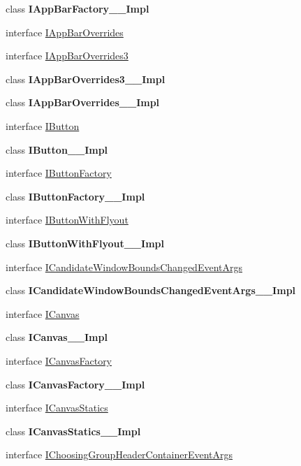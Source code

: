 \begin{DoxyCompactItemize}
class {\bfseries I\+App\+Bar\+Factory\+\_\+\+\_\+\+Impl}
\item 
interface \hyperlink{interface_windows_1_1_u_i_1_1_xaml_1_1_controls_1_1_i_app_bar_overrides}{I\+App\+Bar\+Overrides}
\item 
interface \hyperlink{interface_windows_1_1_u_i_1_1_xaml_1_1_controls_1_1_i_app_bar_overrides3}{I\+App\+Bar\+Overrides3}
\item 
class {\bfseries I\+App\+Bar\+Overrides3\+\_\+\+\_\+\+Impl}
\item 
class {\bfseries I\+App\+Bar\+Overrides\+\_\+\+\_\+\+Impl}
\item 
interface \hyperlink{interface_windows_1_1_u_i_1_1_xaml_1_1_controls_1_1_i_button}{I\+Button}
\item 
class {\bfseries I\+Button\+\_\+\+\_\+\+Impl}
\item 
interface \hyperlink{interface_windows_1_1_u_i_1_1_xaml_1_1_controls_1_1_i_button_factory}{I\+Button\+Factory}
\item 
class {\bfseries I\+Button\+Factory\+\_\+\+\_\+\+Impl}
\item 
interface \hyperlink{interface_windows_1_1_u_i_1_1_xaml_1_1_controls_1_1_i_button_with_flyout}{I\+Button\+With\+Flyout}
\item 
class {\bfseries I\+Button\+With\+Flyout\+\_\+\+\_\+\+Impl}
\item 
interface \hyperlink{interface_windows_1_1_u_i_1_1_xaml_1_1_controls_1_1_i_candidate_window_bounds_changed_event_args}{I\+Candidate\+Window\+Bounds\+Changed\+Event\+Args}
\item 
class {\bfseries I\+Candidate\+Window\+Bounds\+Changed\+Event\+Args\+\_\+\+\_\+\+Impl}
\item 
interface \hyperlink{interface_windows_1_1_u_i_1_1_xaml_1_1_controls_1_1_i_canvas}{I\+Canvas}
\item 
class {\bfseries I\+Canvas\+\_\+\+\_\+\+Impl}
\item 
interface \hyperlink{interface_windows_1_1_u_i_1_1_xaml_1_1_controls_1_1_i_canvas_factory}{I\+Canvas\+Factory}
\item 
class {\bfseries I\+Canvas\+Factory\+\_\+\+\_\+\+Impl}
\item 
interface \hyperlink{interface_windows_1_1_u_i_1_1_xaml_1_1_controls_1_1_i_canvas_statics}{I\+Canvas\+Statics}
\item 
class {\bfseries I\+Canvas\+Statics\+\_\+\+\_\+\+Impl}
\item 
interface \hyperlink{interface_windows_1_1_u_i_1_1_xaml_1_1_controls_1_1_i_choosing_group_header_container_event_args}{I\+Choosing\+Group\+Header\+Container\+Event\+Args}

\end{DoxyCompactItemize}
